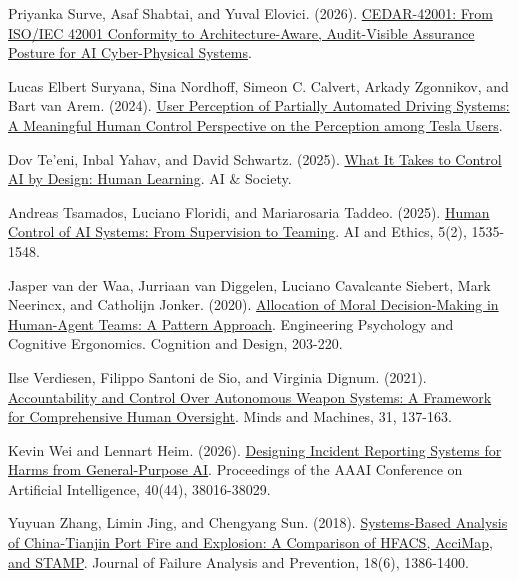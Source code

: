 \documentclass[11pt]{article}
\newenvironment{TAEReferences}{%
  \begin{list}{}{%
    \renewcommand{\makelabel}[1]{}%
    \setlength{\labelwidth}{0pt}%
    \setlength{\labelsep}{0pt}%
    \setlength{\leftmargin}{0.5in}%
    \setlength{\itemindent}{-0.5in}%
    \setlength{\itemsep}{0.45em}%
    \setlength{\parsep}{0pt}%
    \setlength{\topsep}{0.25em}%
  }%
}{\end{list}}
\begin{document}
\begin{TAEReferences}
\item{}\label{reference-42} Priyanka Surve, Asaf Shabtai, and Yuval Elovici. (2026). \href{https://doi.org/10.48550/arXiv.2606.21276}{CEDAR-42001: From ISO/IEC 42001 Conformity to Architecture-Aware, Audit-Visible Assurance Posture for AI Cyber-Physical Systems}.
\item{}\label{reference-43} Lucas Elbert Suryana, Sina Nordhoff, Simeon C. Calvert, Arkady Zgonnikov, and Bart van Arem. (2024). \href{https://doi.org/10.48550/arXiv.2402.08080}{User Perception of Partially Automated Driving Systems: A Meaningful Human Control Perspective on the Perception among Tesla Users}.
\item{}\label{reference-44} Dov Te'eni, Inbal Yahav, and David Schwartz. (2025). \href{https://doi.org/10.1007/s00146-025-02401-y}{What It Takes to Control AI by Design: Human Learning}. AI \& Society.
\item{}\label{reference-45} Andreas Tsamados, Luciano Floridi, and Mariarosaria Taddeo. (2025). \href{https://doi.org/10.1007/s43681-024-00489-4}{Human Control of AI Systems: From Supervision to Teaming}. AI and Ethics, 5(2), 1535-1548.
\item{}\label{reference-46} Jasper van der Waa, Jurriaan van Diggelen, Luciano Cavalcante Siebert, Mark Neerincx, and Catholijn Jonker. (2020). \href{https://doi.org/10.1007/978-3-030-49183-3_16}{Allocation of Moral Decision-Making in Human-Agent Teams: A Pattern Approach}. Engineering Psychology and Cognitive Ergonomics. Cognition and Design, 203-220.
\item{}\label{reference-47} Ilse Verdiesen, Filippo Santoni de Sio, and Virginia Dignum. (2021). \href{https://doi.org/10.1007/s11023-020-09532-9}{Accountability and Control Over Autonomous Weapon Systems: A Framework for Comprehensive Human Oversight}. Minds and Machines, 31, 137-163.
\item{}\label{reference-48} Kevin Wei and Lennart Heim. (2026). \href{https://doi.org/10.1609/aaai.v40i44.41139}{Designing Incident Reporting Systems for Harms from General-Purpose AI}. Proceedings of the AAAI Conference on Artificial Intelligence, 40(44), 38016-38029.
\item{}\label{reference-49} Yuyuan Zhang, Limin Jing, and Chengyang Sun. (2018). \href{https://doi.org/10.1007/s11668-018-0534-1}{Systems-Based Analysis of China-Tianjin Port Fire and Explosion: A Comparison of HFACS, AcciMap, and STAMP}. Journal of Failure Analysis and Prevention, 18(6), 1386-1400.

\end{TAEReferences}
\end{document}
